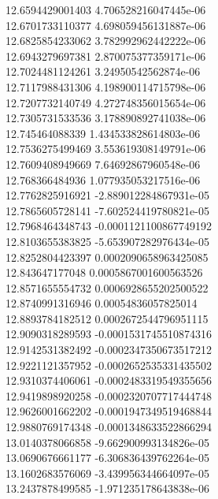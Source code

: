 {12.6594429001403 4.706528216047445e-06 \\
12.6701733110377 4.698059456131887e-06 \\
12.6825854233062 3.782992962442222e-06 \\
12.6943279697381 2.870075377359171e-06 \\
12.7024481124261 3.24950542562874e-06 \\
12.7117988431306 4.198900114715798e-06 \\
12.7207732140749 4.272748356015654e-06 \\
12.7305731533536 3.178890892741038e-06 \\
12.745464088339 1.434533828614803e-06 \\
12.7536275499469 3.553619308149791e-06 \\
12.7609408949669 7.64692867960548e-06 \\
12.768366484936 1.077935053217516e-06 \\
12.7762825916921 -2.889012284867931e-05 \\
12.7865605728141 -7.602524419780821e-05 \\
12.7968464348743 -0.0001121100867749192 \\
12.8103655383825 -5.653907282976434e-05 \\
12.8252804423397 0.0002090658963425085 \\
12.843647177048 0.0005867001600563526 \\
12.8571655554732 0.0006928655202500522 \\
12.8740991316946 0.00054836057825014 \\
12.8893784182512 0.0002672544796951115 \\
12.9090318289593 -0.0001531745510874316 \\
12.9142531382492 -0.0002347350673517212 \\
12.9221121357952 -0.0002652535331435502 \\
12.9310374406061 -0.0002483319549355656 \\
12.9419898920258 -0.0002320707717444748 \\
12.9626001662202 -0.0001947349519468844 \\
12.9880769174348 -0.0001348633522866294 \\
13.0140378066858 -9.662900993134826e-05 \\
13.0690676661177 -6.306836439762264e-05 \\
13.1602683576069 -3.439956344664097e-05 \\
13.2437878499585 -1.971235178643838e-06 \\
}
